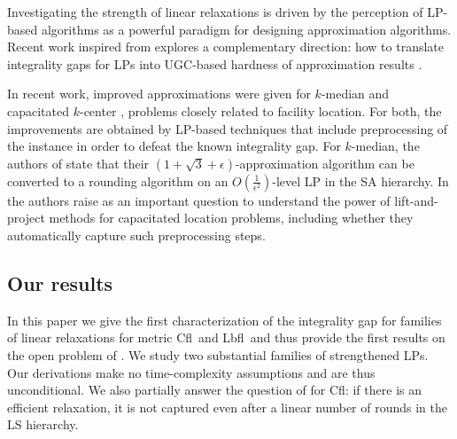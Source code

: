 \documentclass[11pt]{article}\usepackage{amsmath}
\newcommand{\lbfl}{{\sc Lbfl}}
\newcommand{\cfl}{{\sc Cfl}}
\begin{document}
Investigating the strength  of linear relaxations  is driven by the 
perception of LP-based algorithms as a  powerful paradigm for designing
approximation algorithms. 
Recent work inspired from 
\cite{Raghavendra08} 
explores a complementary direction: how to translate integrality gaps for LPs into {\sf UGC}-based
hardness of approximation results \cite{KumarMTV11}. 


In  recent work,  improved  approximations  were given  for
$k$-median   \cite{LiS13}      and   capacitated   $k$-center
\cite{CyganHK12,AnBS13},  problems closely  related to
facility location.  For both, the improvements are obtained 
by LP-based techniques
that  include preprocessing  of the  instance in  order to  defeat the
known integrality gap. For $k$-median, the authors of \cite{LiS13}
state that their 
$(1+\sqrt{3} + \epsilon)$-approximation algorithm   can
be converted  to a  rounding algorithm on an 
 $O(\frac{1}{\epsilon^2})$-level LP  in the SA hierarchy.  In \cite{AnBS13}
the authors raise as an important question  to understand  the
power  of lift-and-project methods  for capacitated  location
problems, including  whether they 
automatically capture such preprocessing steps. 




\subsection{Our results}
In this paper we give the first characterization  of 
 the    integrality gap  for families of 
 linear relaxations  for metric \cfl\ and \lbfl\  and thus provide the
 first results on the open problem of \cite{ShmoysWbook}. 
We study two substantial families of
strengthened LPs. 
Our derivations make  no time-complexity assumptions 
and are thus unconditional.  We also partially  answer 
the question of \cite{AnBS13} for \cfl:  if there is an efficient relaxation, 
it is not captured even after a linear number of rounds in
the LS hierarchy.  
\end{document}
